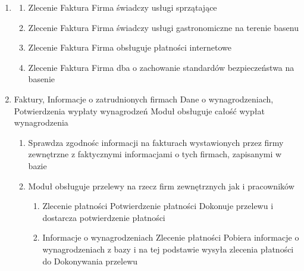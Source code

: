 \documentclass[a4paper,11pt]{article}
\begin{document}
\begin{enumerate}
\begin{enumerate}
\begin{enumerate}
                \end{enumerate}
        \end{enumerate}
    \item {}
        \begin{enumerate}
            \item {} {Zlecenie} {Faktura} {Firma świadczy usługi sprzątające}
            \item {} {Zlecenie} {Faktura} {Firma świadczy usługi gastronomiczne na terenie basenu}
            \item {} {Zlecenie} {Faktura} {Firma obsługuje płatności internetowe}
            \item {} {Zlecenie} {Faktura} {Firma dba o zachowanie standardów bezpieczeństwa na basenie}
        \end{enumerate}
    \item {} {Faktury, Informacje o zatrudnionych firmach} {Dane o wynagrodzeniach, Potwierdzenia wypłaty wynagrodzeń} {Moduł obsługuje całość wypłat wynagrodzenia}
        \begin{enumerate}
            \item {} {Sprawdza zgodnośc informacji na fakturach wystawionych przez firmy zewnętrzne z faktycznymi informacjami o tych firmach, zapisanymi w bazie}
            \item {} {Moduł obsługuje przelewy na rzecz firm zewnętrznych jak i pracowników}
                \begin{enumerate}
                    \item {} {Zlecenie płatności} {Potwierdzenie płatności} {Dokonuje przelewu i dostarcza potwierdzenie płatności}
                    \item {} {Informacje o wynagrodzeniach} {Zlecenie płatności} {Pobiera informacje o wynagrodzeniach z bazy i na tej podstawie wysyła zlecenia płatności do Dokonywania przelewu}

\end{enumerate}
\end{enumerate}
\end{enumerate}
\end{document}
